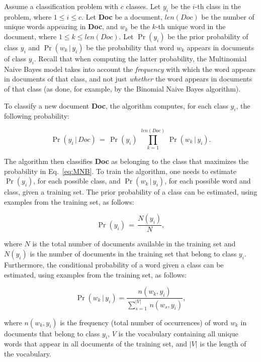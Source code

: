 \documentclass[letterpaper]{article}
\begin{document}
Assume a classification problem with $c$ classes. Let $y_i$ be the $i$-th class in the problem, where $1 \leq i \leq c$. Let \textbf{Doc} be a document, $len(Doc)$ be the number of unique words appearing in \textbf{Doc}, and $w_k$ be the $k$-th unique word in the document, where $1 \leq k \leq len(Doc)$. Let $\Pr(y_i)$ be the prior probability of class $y_i$ and $\Pr(w_k \, | \, y_i)$ be the probability that word $w_k$ appears in documents of class $y_i$. Recall that when computing the latter probability, the Multinomial Naive Bayes model takes into account the \textit{frequency} with which the word appears in documents of that class, and not just \textit{whether} the word appears in documents of that class (as done, for example, by the Binomial Naive Bayes algorithm).

To classify a new document \textbf{Doc}, the algorithm computes, for each class $y_i$, the following probability:

\begin{equation}
    \Pr(y_i \, | \, Doc) \, = \, \Pr(y_i) \,\, \prod_{k=1}^{len(Doc)} \, \Pr(w_k \, | \, y_i).
    \label{eq:MNB}
\end{equation}

\noindent The algorithm then classifies \textbf{Doc} as belonging to the class that maximizes the probability in Eq.~\eqref{eq:MNB}.
%
To train the algorithm, one needs to estimate $\Pr(y_i)$, for each possible class, and $\Pr(w_k \, | \, y_i)$, for each possible word and class, given a training set. The prior probability of a class can be estimated, using examples from the training set, as follows:

\begin{equation}
\Pr(y_i) \, = \,\frac{N(y_i)}{N},
\end{equation}

\noindent where $N$ is the total number of documents available in the training set and $N(y_i)$ is the number of documents in the training set that belong to class $y_i$. Furthermore, the conditional probability of a word given a class can be estimated, using examples from the training set, as follows:

\begin{equation}
   \Pr(w_k \, | \, y_i) = \frac{n(w_k, y_i)}{\sum_{s=1}^{|V|} \, n(w_s, y_i)},
\end{equation}

\noindent where $n(w_k, y_i)$ is the frequency (total number of occurrences) of word $w_k$ in documents that belong to class $y_i$, $V$ is the vocabulary containing all unique words that appear in all documents of the training set, and $|V|$ is the length of the vocabulary.
\end{document}
